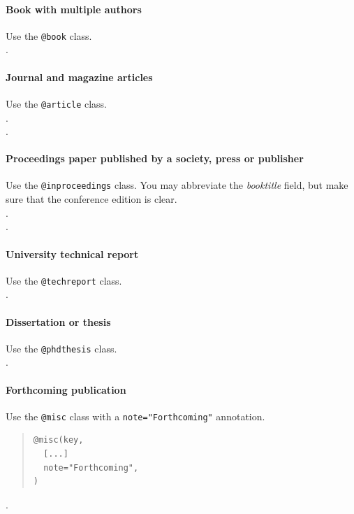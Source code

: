 \paragraph{Book with multiple authors~\nocite{em:86}} Use the \texttt{@book} class.\\[.2em]
.

\paragraph{Journal and magazine articles~\nocite{r:80, hcr:83}} Use the \texttt{@article} class.\\[.2em]
.\\[.2em]
.

\paragraph{Proceedings paper published by a society, press or publisher~\nocite{c:83, c:84}} Use the \texttt{@inproceedings} class. You may abbreviate the \emph{booktitle} field, but make sure that the conference edition is clear.\\[.2em]
.\\[.2em]
.

\paragraph{University technical report~\nocite{r:86}} Use the \texttt{@techreport} class.\\[.2em]
.

\paragraph{Dissertation or thesis~\nocite{c:79}} Use the \texttt{@phdthesis} class.\\[.2em]
.

\paragraph{Forthcoming publication~\nocite{c:21}} Use the \texttt{@misc} class with a \texttt{note="Forthcoming"} annotation.
\begin{quote}
\begin{footnotesize}
\begin{verbatim}
@misc(key,
  [...]
  note="Forthcoming",
)
\end{verbatim}
\end{footnotesize}
\end{quote}
.

